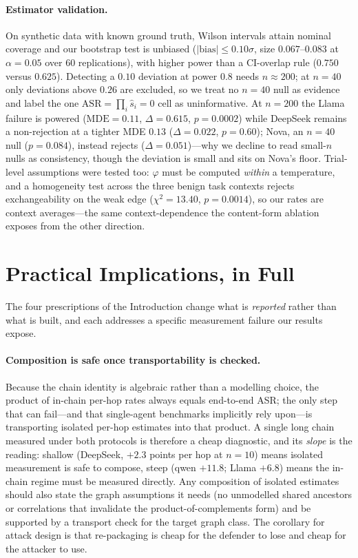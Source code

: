 \documentclass[sigconf,anonymous]{aamas}
\begin{document}
\paragraph{Estimator validation.} On synthetic data with known ground truth, Wilson
intervals attain nominal coverage and our bootstrap test is unbiased
($|\mathrm{bias}| \le 0.10\sigma$, size $0.067$--$0.083$ at $\alpha = 0.05$ over 60
replications), with higher power than a CI-overlap rule ($0.750$ versus $0.625$).
Detecting a $0.10$ deviation at power $0.8$ needs $n \approx 200$; at $n = 40$ only
deviations above $0.26$ are excluded, so we treat no $n = 40$ null as evidence and
label the one $\mathrm{ASR} = \prod_i \hat s_i = 0$ cell as uninformative. At
$n = 200$ the Llama failure is powered ($\mathrm{MDE} = 0.11$, $\Delta = 0.615$,
$p = 0.0002$) while DeepSeek remains a non-rejection at a tighter MDE $0.13$
($\Delta = 0.022$, $p = 0.60$); Nova, an $n = 40$ null ($p = 0.084$), instead rejects
($\Delta = 0.051$)---why we decline to read small-$n$ nulls as consistency, though the
deviation is small and sits on Nova's floor. Trial-level assumptions were tested too:
$\varphi$ must be computed \emph{within} a temperature, and a homogeneity test across
the three benign task contexts rejects exchangeability on the weak edge
($\chi^2 = 13.40$, $p = 0.0014$), so our rates are context averages---the same
context-dependence the content-form ablation exposes from the other direction.

\section{Practical Implications, in Full}
\label{app:discussion}

The four prescriptions of the Introduction change what is \emph{reported} rather than
what is built, and each addresses a specific measurement failure our results expose.

\paragraph{Composition is safe once transportability is checked.} Because the chain
identity is algebraic rather than a modelling choice, the product of in-chain per-hop
rates always equals end-to-end ASR; the only step that can fail---and that single-agent
benchmarks implicitly rely upon---is transporting isolated per-hop estimates into that
product. A single long chain measured under both protocols is therefore a cheap
diagnostic, and its \emph{slope} is the reading: shallow (DeepSeek, $+2.3$ points per
hop at $n = 10$) means isolated measurement is safe to compose, steep (qwen $+11.8$;
Llama $+6.8$) means the in-chain regime must be measured directly. Any composition of
isolated estimates should also state the graph assumptions it needs (no unmodelled
shared ancestors or correlations that invalidate the product-of-complements form) and
be supported by a transport check for the target graph class. The corollary for attack
design is that re-packaging is cheap for the defender to lose and cheap for the
attacker to use.
\end{document}
